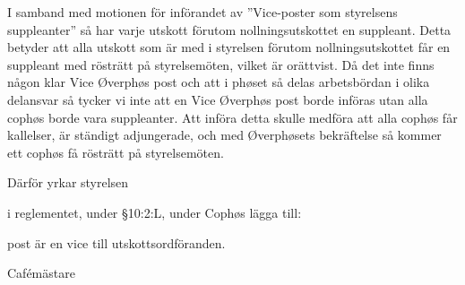 \documentclass[../_main/handlingar.tex]{subfiles}
\begin{document}

I samband med motionen för införandet av ”Vice-poster som styrelsens suppleanter” så har varje utskott förutom nollningsutskottet en suppleant. Detta betyder att alla utskott som är med i styrelsen förutom nollningsutskottet får en suppleant med rösträtt på styrelsemöten, vilket är orättvist. Då det inte finns någon klar Vice Øverphøs post och att i phøset så delas arbetsbördan i olika delansvar så tycker vi inte att en Vice Øverphøs post borde införas utan alla cophøs borde vara suppleanter. Att införa detta skulle medföra att alla cophøs får kallelser, är ständigt adjungerade, och med Øverphøsets bekräftelse så kommer ett cophøs få rösträtt på styrelsemöten. 

Därför yrkar styrelsen
\begin{attsatser}
    \att i reglementet, under §10:2:L, under Cophøs lägga till: 

    \begin{dashlist}
          \Denna post är en vice till utskottsordföranden.
     \end{dashlist}


\end{attsatser}

\begin{signatures}{1}
    \ist
    \signature{\cafem}{Cafémästare}
\end{signatures}
\end{document}
